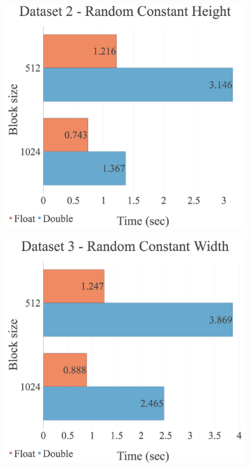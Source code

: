 \begin{figure}[H]
\begin{adjustwidth}{-2cm}{-2cm}
\begin{subfigure}{.62\textwidth}
\end{subfigure}
\par\bigskip
\par\bigskip
\begin{subfigure}{.62\textwidth}
  \centering
  \includegraphics[width=1\textwidth]{img/experiments/multi-blocks-2_RANDCONSTHEIGHT.png}
\end{subfigure}
\begin{subfigure}{.62\textwidth}
  \centering
  \includegraphics[width=1\textwidth]{img/experiments/multi-blocks-3_RANDCONSTWIDTH.png}
\end{subfigure}
\end{adjustwidth}
\end{figure}

